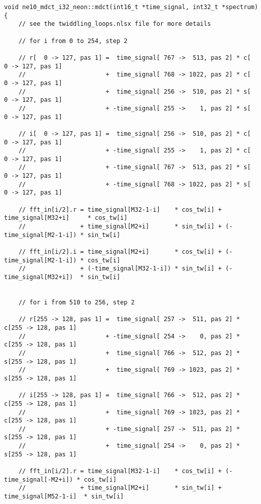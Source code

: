\documentclass{article}
\begin{document}
\begin{lstlisting}
void ne10_mdct_i32_neon::mdct(int16_t *time_signal, int32_t *spectrum)
{
    // see the twiddling_loops.nlsx file for more details
    
    // for i from 0 to 254, step 2

    // r[  0 -> 127, pas 1] =  time_signal[ 767 ->  513, pas 2] * c[  0 -> 127, pas 1]
    //                      +  time_signal[ 768 -> 1022, pas 2] * c[  0 -> 127, pas 1]
    //                      +  time_signal[ 256 ->  510, pas 2] * s[  0 -> 127, pas 1]
    //                      + -time_signal[ 255 ->    1, pas 2] * s[  0 -> 127, pas 1]

    // i[  0 -> 127, pas 1] =  time_signal[ 256 ->  510, pas 2] * c[  0 -> 127, pas 1]
    //                      + -time_signal[ 255 ->    1, pas 2] * c[  0 -> 127, pas 1]
    //                      + -time_signal[ 767 ->  513, pas 2] * s[  0 -> 127, pas 1]
    //                      + -time_signal[ 768 -> 1022, pas 2] * s[  0 -> 127, pas 1]

    // fft_in[i/2].r = time_signal[M32-1-i]    * cos_tw[i] + time_signal[M32+i]     * cos_tw[i]
    //               + time_signal[M2+i]       * sin_tw[i] + (-time_signal[M2-1-i]) * sin_tw[i]

    // fft_in[i/2].i = time_signal[M2+i]       * cos_tw[i] + (-time_signal[M2-1-i]) * cos_tw[i]
    //               + (-time_signal[M32-1-i]) * sin_tw[i] + (-time_signal[M32+i])  * sin_tw[i]


    // for i from 510 to 256, step 2

    // r[255 -> 128, pas 1] =  time_signal[ 257 ->  511, pas 2] * c[255 -> 128, pas 1]
    //                      + -time_signal[ 254 ->    0, pas 2] * c[255 -> 128, pas 1]
    //                      +  time_signal[ 766 ->  512, pas 2] * s[255 -> 128, pas 1]
    //                      +  time_signal[ 769 -> 1023, pas 2] * s[255 -> 128, pas 1]

    // i[255 -> 128, pas 1] =  time_signal[ 766 ->  512, pas 2] * c[255 -> 128, pas 1]
    //                      +  time_signal[ 769 -> 1023, pas 2] * c[255 -> 128, pas 1]
    //                      + -time_signal[ 257 ->  511, pas 2] * s[255 -> 128, pas 1]
    //                      +  time_signal[ 254 ->    0, pas 2] * s[255 -> 128, pas 1]

    // fft_in[i/2].r = time_signal[M32-1-i]    * cos_tw[i] + (-time_signal[-M2+i]) * cos_tw[i]
    //               + time_signal[M2+i]       * sin_tw[i] + time_signal[M52-1-i]  * sin_tw[i]


\end{lstlisting}
\end{document}
